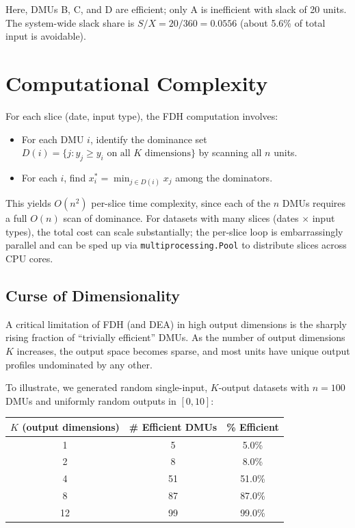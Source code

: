 \documentclass[11pt]{article}
\theoremstyle{definition}
\theoremstyle{plain}
\theoremstyle{remark}
\begin{document}
Here, DMUs B, C, and D are efficient; only A is inefficient with slack of 20 units.
The system-wide slack share is $S / X = 20 / 360 = 0.0556$ (about 5.6\% of total input is avoidable).

\section{Computational Complexity}

For each slice (date, input type), the FDH computation involves:
\begin{itemize}
\item For each DMU $i$, identify the dominance set $D(i) = \{j : y_j \ge y_i \text{ on all } K \text{ dimensions}\}$ by scanning all $n$ units.
\item For each $i$, find $x_i^* = \min_{j \in D(i)} x_j$ among the dominators.
\end{itemize}
This yields $O(n^2)$ per-slice time complexity, since each of the $n$ DMUs requires a full $O(n)$ scan of dominance.
For datasets with many slices (dates $\times$ input types), the total cost can scale substantially; the per-slice loop is embarrassingly parallel
and can be sped up via \texttt{multiprocessing.Pool} to distribute slices across CPU cores.

\subsection*{Curse of Dimensionality}

A critical limitation of FDH (and DEA) in high output dimensions is the sharply rising fraction of ``trivially efficient'' DMUs.
As the number of output dimensions $K$ increases, the output space becomes sparse, and most units have unique output profiles undominated by any other.

To illustrate, we generated random single-input, $K$-output datasets with $n=100$ DMUs and uniformly random outputs in $[0, 10]$:

\begin{table}[h]
\centering
\begin{tabular}{ccc}
\toprule
$K$ (output dimensions) & \# Efficient DMUs & \% Efficient \\
\midrule
1 & 5 & 5.0\% \\
2 & 8 & 8.0\% \\
4 & 51 & 51.0\% \\
8 & 87 & 87.0\% \\
12 & 99 & 99.0\% \\
\bottomrule
\end{tabular}
\end{table}
\end{document}
